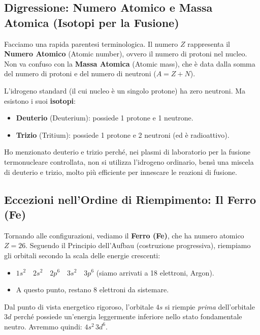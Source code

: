 \subsection{Digressione: Numero Atomico e Massa Atomica (Isotopi per la Fusione)}

Facciamo una rapida parentesi terminologica. Il numero $Z$ rappresenta il \textbf{Numero Atomico} (Atomic number), ovvero il numero di protoni nel nucleo.
Non va confuso con la \textbf{Massa Atomica} (Atomic mass), che è data dalla somma del numero di protoni e del numero di neutroni ($A = Z + N$).

L'idrogeno standard (il cui nucleo è un singolo protone) ha zero neutroni. Ma esistono i suoi \textbf{isotopi}:
\begin{itemize}
\item \textbf{Deuterio} (Deuterium): possiede 1 protone e 1 neutrone.
\item \textbf{Trizio} (Tritium): possiede 1 protone e 2 neutroni (ed è radioattivo).
\end{itemize}
Ho menzionato deuterio e trizio perché, nei plasmi di laboratorio per la fusione termonucleare controllata, non si utilizza l'idrogeno ordinario, bensì una miscela di deuterio e trizio, molto più efficiente per innescare le reazioni di fusione.

\subsection{Eccezioni nell'Ordine di Riempimento: Il Ferro (Fe)}

Tornando alle configurazioni, vediamo il \textbf{Ferro (Fe)}, che ha numero atomico \textbf{$Z = 26$}.
Seguendo il Principio dell'Aufbau (costruzione progressiva), riempiamo gli orbitali secondo la scala delle energie crescenti:
\begin{itemize}
\item $1s^2 \quad 2s^2 \quad 2p^6 \quad 3s^2 \quad 3p^6$ (siamo arrivati a 18 elettroni, Argon).
\item A questo punto, restano 8 elettroni da sistemare.
\end{itemize}
Dal punto di vista energetico rigoroso, l'orbitale $4s$ si riempie \textit{prima} dell'orbitale $3d$ perché possiede un'energia leggermente inferiore nello stato fondamentale neutro. Avremmo quindi: $4s^2 \, 3d^6$.

